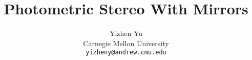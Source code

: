 \documentclass[10pt, twocolumn, letterpaper]{article}
\begin{document}
  \title{Photometric Stereo With Mirrors}
  \author{
    Yizhen Yu \\
    Carnegie Mellon University \\
    \texttt{\small yizheny@andrew.cmu.edu}
  }
  \maketitle
  
  
  
  
  
  
  {
    \small
    
    
  }
\end{document}
